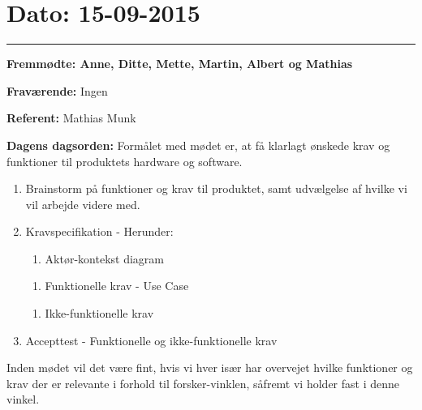 \section{Dato: 15-09-2015}
\hrule

\textbf{Fremmødte: Anne, Ditte, Mette, Martin, Albert og Mathias} 

\textbf{Fraværende:} Ingen

\textbf{Referent:} Mathias Munk

\textbf{Dagens dagsorden:}
\newline
Formålet med mødet er, at få klarlagt ønskede krav og funktioner til produktets hardware og software.
\begin{enumerate}
\item Brainstorm på funktioner og krav til produktet, samt udvælgelse af hvilke vi vil arbejde videre med.

\item Kravspecifikation - Herunder:

\begin{enumerate}
\item Aktør-kontekst diagram
\end{enumerate}
\begin{enumerate}
\item Funktionelle krav - Use Case
\end{enumerate}
\begin{enumerate}
\item Ikke-funktionelle krav
\end{enumerate}
\item Accepttest - Funktionelle og ikke-funktionelle krav
\end{enumerate}

Inden mødet vil det være fint, hvis vi hver især har overvejet hvilke funktioner og krav der er relevante i forhold til forsker-vinklen, såfremt vi holder fast i denne vinkel.


